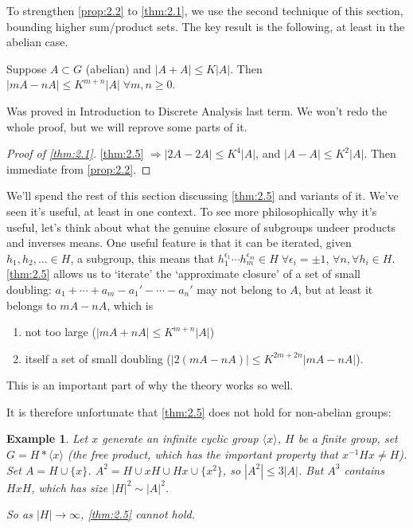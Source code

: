 \documentclass{article}
\newtheorem{nexample}[nthm]{Example}
\numberwithin{equation}{section}
\begin{document}
To strengthen \cref{prop:2.2} to \cref{thm:2.1}, we use the second technique of this section, bounding higher sum/product sets. The key result is the following, at least in the abelian case.
\begin{nthm}\label{thm:2.5}
  Suppose $A \subset G$ (abelian) and $|A+A| \leq K|A|$.
  Then $|mA - nA| \leq K^{m+n} |A| \; \forall m, n \geq 0$.
\end{nthm}
Was proved in Introduction to Discrete Analysis last term. We won't redo the whole proof, but we will reprove some parts of it.
\begin{proof}[Proof of \cref{thm:2.1}]
  \cref{thm:2.5} $\Rightarrow |2A - 2A| \leq K^4 |A|$, and $|A-A| \leq K^2 |A|$. Then immediate from \cref{prop:2.2}.
\end{proof}

We'll spend the rest of this section discussing \cref{thm:2.5} and variants of it.
We've seen it's useful, at least in one context. To see more philosophically why it's useful, let's think about what the genuine closure of subgroups undeer products and inverses means.
One useful feature is that it can be iterated, given $h_1, h_2, \dotsc \in H$, a subgroup, this means that $h_1^{\epsilon_1} \dotsm h_m^{\epsilon_m} \in H\; \forall \epsilon_i = \pm 1$, $\forall n, \forall h_i \in H$.
\cref{thm:2.5} allows us to `iterate' the `approximate closure' of a set of small doubling:
$a_1 + \dotsb + a_m - a_1' - \dotsb - a_n'$ may not belong to $A$, but at least it belongs to $mA - nA$, which is
\begin{enumerate}[label=(\alph*)]
  \item not too large ($|mA + nA| \leq K^{m+n} |A|$)
  \item itself a set of small doubling ($|2(mA-nA)| \leq K^{2m+2n} |mA - nA|$).
\end{enumerate}
This is an important part of why the theory works so well.

It is therefore unfortunate that \cref{thm:2.5} does not hold for non-abelian groups:
\begin{nexample}\label{eg:2.6}
  Let $x$ generate an infinite cyclic group $\langle x \rangle$, $H$ be a finite group, set $G = H * \langle x \rangle$ (the free product, which has the important property that $x^{-1} H x \neq H$).
  Set $A = H \cup \{x\}$.
  $A^2 = H \cup x H \cup H x \cup \{x^2\}$, so $|A^2| \leq 3 |A|$. But $A^3$ contains $HxH$, which has size $|H|^2 \sim |A|^2$.

  So as $|H| \to \infty$, \cref{thm:2.5} cannot hold.
\end{nexample}
\end{document}

